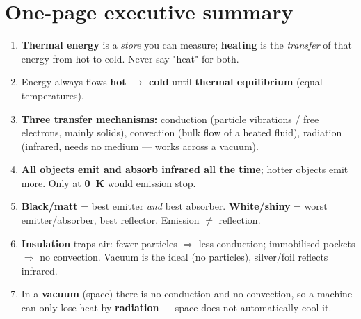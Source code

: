 \documentclass[11pt,a4paper]{article}
\begin{document}
\clearpage
\section{One-page executive summary}

\begin{keybox}
\begin{enumerate}[leftmargin=1.4em,itemsep=2pt]
  \item \textbf{Thermal energy} is a \emph{store} you can measure; \textbf{heating} is the
        \emph{transfer} of that energy from hot to cold. Never say "heat" for both.
  \item Energy always flows \textbf{hot $\to$ cold} until \textbf{thermal equilibrium}
        (equal temperatures).
  \item \textbf{Three transfer mechanisms:} conduction (particle vibrations / free
        electrons, mainly solids), convection (bulk flow of a heated fluid), radiation
        (infrared, needs no medium --- works across a vacuum).
  \item \textbf{All objects emit and absorb infrared all the time}; hotter objects emit
        more. Only at \textbf{\SI{0}{K}} would emission stop.
  \item \textbf{Black/matt} = best emitter \emph{and} best absorber. \textbf{White/shiny}
        = worst emitter/absorber, best reflector. Emission $\ne$ reflection.
  \item \textbf{Insulation} traps air: fewer particles $\Rightarrow$ less conduction;
        immobilised pockets $\Rightarrow$ no convection. Vacuum is the ideal (no
        particles), silver/foil reflects infrared.
  \item In a \textbf{vacuum} (space) there is no conduction and no convection, so a
        machine can only lose heat by \textbf{radiation} --- space does not automatically
        cool it.
\end{enumerate}
\end{keybox}
\end{document}
